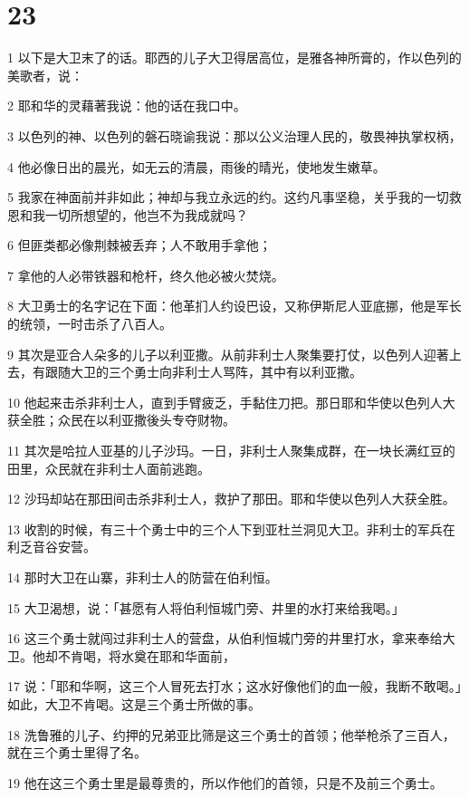 \chapter{23}

\par 1 以下是大卫末了的话。耶西的儿子大卫得居高位，是雅各神所膏的，作以色列的美歌者，说：
\par 2 耶和华的灵藉著我说：他的话在我口中。
\par 3 以色列的神、以色列的磐石晓谕我说：那以公义治理人民的，敬畏神执掌权柄，
\par 4 他必像日出的晨光，如无云的清晨，雨後的晴光，使地发生嫩草。
\par 5 我家在神面前并非如此；神却与我立永远的约。这约凡事坚稳，关乎我的一切救恩和我一切所想望的，他岂不为我成就吗？
\par 6 但匪类都必像荆棘被丢弃；人不敢用手拿他；
\par 7 拿他的人必带铁器和枪杆，终久他必被火焚烧。
\par 8 大卫勇士的名字记在下面：他革扪人约设巴设，又称伊斯尼人亚底挪，他是军长的统领，一时击杀了八百人。
\par 9 其次是亚合人朵多的儿子以利亚撒。从前非利士人聚集要打仗，以色列人迎著上去，有跟随大卫的三个勇士向非利士人骂阵，其中有以利亚撒。
\par 10 他起来击杀非利士人，直到手臂疲乏，手黏住刀把。那日耶和华使以色列人大获全胜；众民在以利亚撒後头专夺财物。
\par 11 其次是哈拉人亚基的儿子沙玛。一日，非利士人聚集成群，在一块长满红豆的田里，众民就在非利士人面前逃跑。
\par 12 沙玛却站在那田间击杀非利士人，救护了那田。耶和华使以色列人大获全胜。
\par 13 收割的时候，有三十个勇士中的三个人下到亚杜兰洞见大卫。非利士的军兵在利乏音谷安营。
\par 14 那时大卫在山寨，非利士人的防营在伯利恒。
\par 15 大卫渴想，说：「甚愿有人将伯利恒城门旁、井里的水打来给我喝。」
\par 16 这三个勇士就闯过非利士人的营盘，从伯利恒城门旁的井里打水，拿来奉给大卫。他却不肯喝，将水奠在耶和华面前，
\par 17 说：「耶和华啊，这三个人冒死去打水；这水好像他们的血一般，我断不敢喝。」如此，大卫不肯喝。这是三个勇士所做的事。
\par 18 洗鲁雅的儿子、约押的兄弟亚比筛是这三个勇士的首领；他举枪杀了三百人，就在三个勇士里得了名。
\par 19 他在这三个勇士里是最尊贵的，所以作他们的首领，只是不及前三个勇士。
